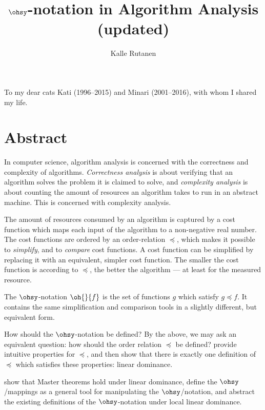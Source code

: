 \documentclass[b5paper, english, oneside]{memoir}
\title{\texorpdfstring{$\ohsy$}{O}-notation in Algorithm Analysis \\ (updated)}
\author{Kalle Rutanen}
\begin{document}
\frontmatter

\ifthesis

\else
\maketitle
\fi

\newpage
\thispagestyle{empty}
\vspace*{.35\textheight}
\begin{center}To my dear cats Kati (1996--2015) and Minari (2001--2016), \newline with whom I shared my life.
\end{center}

\chapter{Abstract}
\setcounter{page}{1}

In computer science, algorithm analysis is concerned with the correctness and complexity of algorithms. \emph{Correctness analysis} is about verifying that an algorithm solves the problem it is claimed to solve, and \emph{complexity analysis} is about counting the amount of resources an algorithm takes to run in an abstract machine. This \manuscript{} is concerned with complexity analysis. 

The amount of resources consumed by an algorithm is captured by a cost function which maps each input of the algorithm to a non-negative real number. The cost functions are ordered by an order-relation $\preceq$, which makes it possible to \emph{simplify}, and to \emph{compare} cost functions. A cost function can be simplified by replacing it with an equivalent, simpler cost function. The smaller the cost function is according to $\preceq$, the better the algorithm --- at least for the measured resource.  

The $\ohsy$-notation $\oh{}{f}$ is the set of functions $g$ which satisfy $g \preceq f$. It contains the same simplification and comparison tools in a slightly different, but equivalent form. 

How should the $\ohsy$-notation be defined? By the above, we may ask an equivalent question: how should the order relation $\preceq$ be defined? \We{} provide \nprim{} intuitive properties for $\preceq$, and then show that there is exactly one definition of $\preceq$ which satisfies these properties: linear dominance. 

\We{} show that Master theorems hold under linear dominance, define the $\ohsy$\-/mappings as a general tool for manipulating the $\ohsy$\-/notation, and abstract the existing definitions of the $\ohsy$-notation under local linear dominance.
\end{document}
